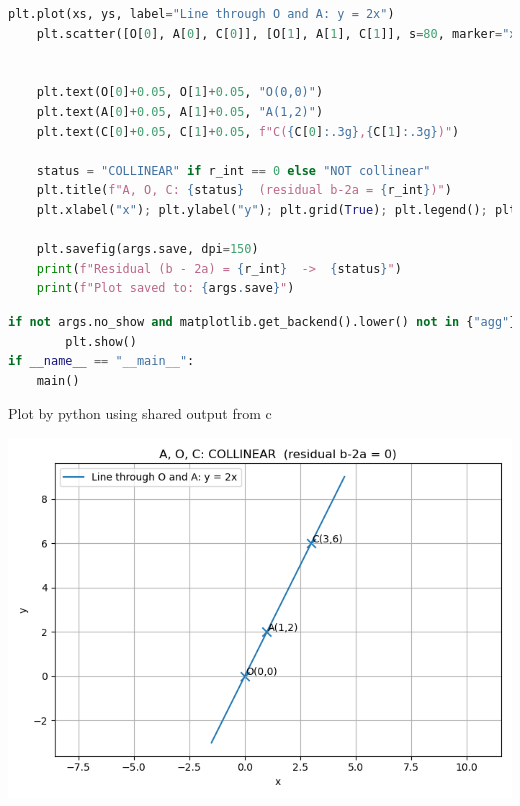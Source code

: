 \documentclass{beamer}
\begin{document}
\begin{frame}[fragile]
\begin{lstlisting}[language=Python]
    plt.plot(xs, ys, label="Line through O and A: y = 2x")
    plt.scatter([O[0], A[0], C[0]], [O[1], A[1], C[1]], s=80, marker="x")
   

    plt.text(O[0]+0.05, O[1]+0.05, "O(0,0)")
    plt.text(A[0]+0.05, A[1]+0.05, "A(1,2)")
    plt.text(C[0]+0.05, C[1]+0.05, f"C({C[0]:.3g},{C[1]:.3g})")

    status = "COLLINEAR" if r_int == 0 else "NOT collinear"
    plt.title(f"A, O, C: {status}  (residual b-2a = {r_int})")
    plt.xlabel("x"); plt.ylabel("y"); plt.grid(True); plt.legend(); plt.axis("equal"); plt.tight_layout()

    plt.savefig(args.save, dpi=150)
    print(f"Residual (b - 2a) = {r_int}  ->  {status}")
    print(f"Plot saved to: {args.save}")
\end{lstlisting}
\end{frame}
\begin{frame}[fragile]
\begin{lstlisting}[language=Python]
    if not args.no_show and matplotlib.get_backend().lower() not in {"agg"}:
        plt.show()
if __name__ == "__main__":
    main()

\end{lstlisting}
\end{frame}
\begin{frame}{Plot by python using shared output from c}
	\begin{center}
		\includegraphics[width=0.6\columnwidth]{figs/Figure_1.png}
	\end{center}
\end{frame}
\end{document}
